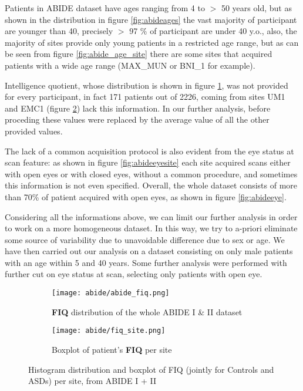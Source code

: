 \documentclass[10pt]{report}
\begin{document}
Patients in ABIDE dataset have ages ranging from 4 to $>$ 50 years old, but as shown in the distribution in figure \ref{fig:abideages} the vast majority of participant are younger than 40, precisely $>$ 97 $\%$ of participant are under 40 y.o., also, the majority of sites provide only young patients in a restricted age range, but  as can be seen from figure \ref{fig:abide_age_site} there are some sites that acquired patients with a wide age range (MAX\_MUN or BNI\_1 for example).


Intelligence quotient, whose distribution is shown in figure \ref{fig:abidefiq}, was not provided for every participant, in fact 171 patients out of 2226, coming from sites UM1 and EMC1 (figure \ref{fig:abide_fiq_site}) lack this information.
In our further analysis, before proceding these values were replaced by the average value of all the other provided values.

The lack of a common acquisition protocol is also evident from the eye status at scan feature: as shown in figure \ref{fig:abideeyesite} each site acquired scans either with open eyes or with closed eyes, without a common procedure, and sometimes this information is not even specified.
Overall, the whole dataset consists of more than 70\% of patient acquired with open eyes, as shown in figure \ref{fig:abideeye}.

Considering all the informations above, we can limit our further analysis in order to work on a more homogeneous dataset. In this way, we try to a-priori eliminate some source of variability due to unavoidable difference due to sex or age.
We have then carried out our analysis on a dataset consisting on only male patients with an age within 5 and 40 years. Some further analysis were performed with further cut on eye status at scan, selecting only patients with open eye.




\begin{figure}
\centering
\begin{subfigure}{0.5\textwidth}
\texttt{[image: abide/abide\_fiq.png]}
\caption{\textbf{FIQ} distribution of the whole ABIDE I \& II dataset}
\label{fig:abidefiq}
\end{subfigure}
\hspace{2cm}
\begin{subfigure}{0.9\textwidth}
\texttt{[image: abide/fiq\_site.png]}
\caption{Boxplot of patient's \textbf{FIQ} per site}
\label{fig:abide_fiq_site}
\end{subfigure}
\caption{Histogram distribution and boxplot of FIQ (jointly for Controls and ASDs) per site, from ABIDE I + II}
\label{}
\end{figure}
\end{document}
